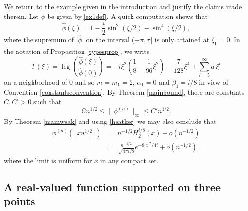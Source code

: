 \documentclass{article}
\theoremstyle{theorem}
\theoremstyle{remark}
\begin{document}
We return to the example given in the introduction and justify the claims made
therein. Let $\phi$ be given by \eqref{ex1def}. A quick computation shows that 
\begin{equation*}
\hat{\phi}(\xi)=1-\frac{i}{2}\sin^2(\xi/2)-\sin^{4}(\xi/2),
\end{equation*}
where the supremum of $|\hat{\phi}|$ on the interval $(-\pi,\pi]$ is only
attained at $\xi_1=0$. In the notation of Proposition \ref{typesprop}, we write
\begin{equation*} 
\Gamma(\xi)=\log\left(\frac{\hat{\phi}(\xi)}{\hat{\phi}(0)}\right)=-i\xi^2(\frac{1
}{8}-\frac{1}{96}\xi^2)-\frac{7}{128}\xi^4+\sum_{l=5}^\infty a_l\xi^l
\end{equation*}
on a neighborhood of $0$ and so $m=m_1=2$, $\alpha_1=0$ and
$\beta_1=i/8$ in view of Convention \ref{constantsconvention}. By Theorem \ref{mainbound}, there are constants $C,C'>0$ such
that
\begin{equation}
Cn^{1/2}\leq \|\phi^{(n)}\|_{\infty}\leq C'n^{1/2}.
\end{equation}
By Theorem \ref{mainweak} and using \eqref{heatker} we may also conclude that
\begin{eqnarray*}
\phi^{(n)}(\lfloor xn^{1/2}\rfloor)&=&n^{-1/2}H_2^{i/8}(x)+o(n^{-1/2})\\
&=&\frac{n^{-1/2}}{\sqrt{4\pi i/8}}e^{-8|x|^2/4i}+o(n^{-1/2}),
\end{eqnarray*}
where the limit is uniform for $x$ in any compact set. 

\subsection{A real-valued function supported on three points}\label{ex3}
\end{document}
